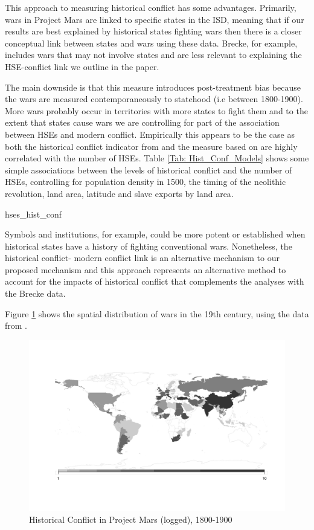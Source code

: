 This approach to measuring historical conflict has some advantages. Primarily, wars in Project Mars are linked to specific states in the ISD, meaning that if our results are best explained by historical states fighting wars then there is a closer conceptual link between states and wars using these data. Brecke, for example, includes wars that may not involve states and are less relevant to explaining the HSE-conflict link we outline in the paper. 

The main downside is that this measure introduces post-treatment bias because the wars are measured contemporaneously to statehood (i.e between 1800-1900). More wars probably occur in territories with more states to fight them and to the extent that states cause wars we are controlling for part of the association between HSEs and modern conflict. Empirically this appears to be the case as both the historical conflict indicator from \citet{Dincecco2019} and the measure based on \citet{Lyall2020} are highly correlated with the number of HSEs. Table \ref{Tab: Hist_Conf_Models} shows some simple associations between the levels of historical conflict and the number of HSEs, controlling for population density in 1500, the timing of the neolithic revolution, land area, latitude and slave exports by land area. 

     {hses_hist_conf}

Symbols and institutions, for example, could be more potent or established when historical states have a history of fighting conventional wars. Nonetheless, the historical conflict- modern conflict link is an alternative mechanism to our proposed mechanism and this approach represents an alternative method to account for the impacts of historical conflict that complements the analyses with the Brecke data. 

Figure \ref{Fig: Mars_Map} shows the spatial distribution of wars in the 19th century, using the data from \citet{Lyall2020}. 

   \begin{figure}[hpbt] \hspace{-0,5cm} 
   \includegraphics[width=\textwidth,
    height=\textheight, keepaspectratio]{img/historical_conflict_pm_map.png} \caption{Historical Conflict in Project Mars (logged), 1800-1900} \label{Fig: Mars_Map} \end{figure}


